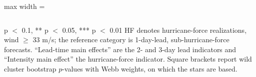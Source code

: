 \begin{table}
\begin{adjustbox}{max width = \textwidth}
\begin{threeparttable}
\begin{tabular}[t]{lcccccc}
\bottomrule
\end{tabular}
\begin{tablenotes}
\item * p $<$ 0.1, ** p $<$ 0.05, *** p $<$ 0.01 HF denotes hurricane-force realizations, wind $\geq$ 33 m/s; the reference category is 1-day-lead, sub-hurricane-force forecasts. ``Lead-time main effects'' are the 2- and 3-day lead indicators and ``Intensity main effect'' the hurricane-force indicator. Square brackets report wild cluster bootstrap $p$-values with Webb weights, on which the stars are based.
\end{tablenotes}
\end{threeparttable}
\end{adjustbox}
\end{table}
